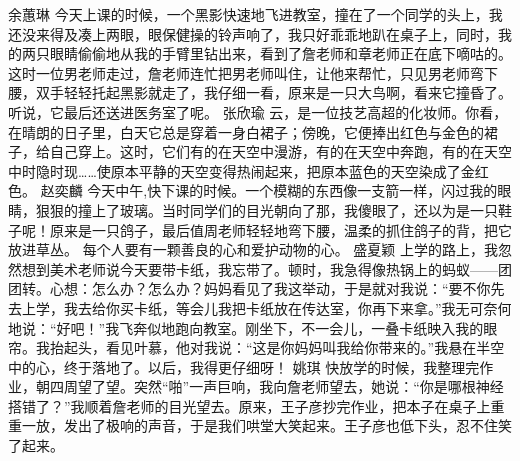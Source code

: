 \markdownRendererInterblockSeparator
{}\markdownRendererInterblockSeparator
{}余蕙琳\markdownRendererInterblockSeparator
{}今天上课的时候，一个黑影快速地飞进教室，撞在了一个同学的头上，我还没来得及凑上两眼，眼保健操的铃声响了，我只好乖乖地趴在桌子上，同时，我的两只眼睛偷偷地从我的手臂里钻出来，看到了詹老师和章老师正在底下嘀咕的。这时一位男老师走过，詹老师连忙把男老师叫住，让他来帮忙，只见男老师弯下腰，双手轻轻托起黑影就走了，我仔细一看，原来是一只大鸟啊，看来它撞昏了。听说，它最后还送进医务室了呢。\markdownRendererInterblockSeparator
{}\markdownRendererInterblockSeparator
{}张欣瑜\markdownRendererInterblockSeparator
{}云，是一位技艺高超的化妆师。你看，在晴朗的日子里，白天它总是穿着一身白裙子；傍晚，它便捧出红色与金色的裙子，给自己穿上。这时，它们有的在天空中漫游，有的在天空中奔跑，有的在天空中时隐时现……使原本平静的天空变得热闹起来，把原本蓝色的天空染成了金红色。\markdownRendererInterblockSeparator
{}\markdownRendererInterblockSeparator
{}赵奕麟\markdownRendererInterblockSeparator
{}今天中午,快下课的时候。一个模糊的东西像一支箭一样，闪过我的眼睛，狠狠的撞上了玻璃。当时同学们的目光朝向了那，我傻眼了，还以为是一只鞋子呢！原来是一只鸽子，最后值周老师轻轻地弯下腰，温柔的抓住鸽子的背，把它放进草丛。\markdownRendererInterblockSeparator
{}每个人要有一颗善良的心和爱护动物的心。\markdownRendererInterblockSeparator
{}\markdownRendererInterblockSeparator
{}盛夏颖\markdownRendererInterblockSeparator
{}上学的路上，我忽然想到美术老师说今天要带卡纸，我忘带了。顿时，我急得像热锅上的蚂蚁——团团转。心想：怎么办？怎么办？妈妈看见了我这举动，于是就对我说：“要不你先去上学，我去给你买卡纸，等会儿我把卡纸放在传达室，你再下来拿。”我无可奈何地说：“好吧！”我飞奔似地跑向教室。刚坐下，不一会儿，一叠卡纸映入我的眼帘。我抬起头，看见叶慕，他对我说：“这是你妈妈叫我给你带来的。”我悬在半空中的心，终于落地了。以后，我得更仔细呀！\markdownRendererInterblockSeparator
{}\markdownRendererInterblockSeparator
{}姚琪\markdownRendererInterblockSeparator
{}快放学的时候，我整理完作业，朝四周望了望。突然“啪”一声巨响，我向詹老师望去，她说：“你是哪根神经搭错了？”我顺着詹老师的目光望去。原来，王子彦抄完作业，把本子在桌子上重重一放，发出了极响的声音，于是我们哄堂大笑起来。王子彦也低下头，忍不住笑了起来。 \markdownRendererInterblockSeparator
{}\markdownRendererInterblockSeparator
